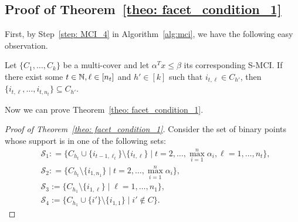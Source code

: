 




\appendix
{}
\renewcommand{\thesubsection}{\Alph{subsection}}

\begin{appendices}



\section{Proof of Theorem~\ref{theo: facet_condition_1}}
\label{subsec: proof_facet_condition_1}

First, by Step~\ref{step: MCI_4} in Algorithm~\ref{alg:mci}, we have the following easy observation.
 \begin{observation}
 \label{obs: obvious}
 Let $\{C_1,\dots,C_k\}$ be a multi-cover and let $\alpha^T x \leq \beta$ its corresponding S-MCI. 
 If there exist some $t \in \mathbb{N}, \ell \in [n_t]$ and $h' \in [k]$ such that $i_{t, \ell} \in C_{h'}$, then $\{ i_{t,\ell}, \ldots, i_{t, n_t}\} \subseteq C_{h'}$.
 \end{observation}

Now we can prove Theorem~\ref{theo: facet_condition_1}.

\begin{proof}[Proof of Theorem~\ref{theo: facet_condition_1}]
Consider the set of binary points whose support is in one of the following sets:
\begin{align}
& \mathscr{S}_1: = \{C_{h_t} \cup \{i_{t-1, \ell_t}\} \setminus \{i_{t, \ell}\} \mid t = 2, \ldots, \max_{i=1}^n \alpha_i, \ell = 1, \ldots, n_t \}, \label{set: 1} \\
& \mathscr{S}_2: = \{C_{h_t} \setminus \{i_{1,n_1}\} \mid t = 2, \ldots,  \max_{i=1}^n \alpha_i\},  \label{set: 2}\\
& \mathscr{S}_3 := \{C_{h_1} \setminus \{i_{1, \ell}\} \mid \ell = 1, \ldots, n_1\},  \label{set: 3}\\
& \mathscr{S}_4 := \{C_{h_1} \cup \{i'\} \setminus \{i_{1, 1}\}  \mid i' \notin C\}.  \label{set: 4}
\end{align}


\end{proof}
\end{appendices}
